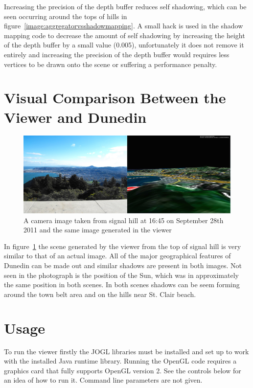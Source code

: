 \documentclass[12pt]{report}
\begin{document}
Increasing the precision of the depth buffer reduces self shadowing, which can be seen occurring around the tops of hills in figure~\ref{image:aggregatorvsshadowmapping}. A small hack is used in the shadow mapping code to decrease the amount of self shadowing by increasing the height of the depth buffer by a small value (0.005), unfortunately it does not remove it entirely and increasing the precision of the depth buffer would requires less vertices to be drawn onto the scene or suffering a performance penalty.

\section{Visual Comparison Between the Viewer and Dunedin}
\begin{figure}[h]
\centering
\includegraphics[width=\textwidth]{realvsviewer.jpg}
\caption{A camera image taken from signal hill at 16:45 on September 28th 2011 and the same image generated in the viewer}
\label{image:realvsviewer}
\end{figure}

In figure~\ref{image:realvsviewer} the scene generated by the viewer from the top of signal hill is very similar to that of an actual image. All of the major geographical features of Dunedin can be made out and similar shadows are present in both images. Not seen in the photograph is the position of the Sun, which was in approximately the same position in both scenes. In both scenes shadows can be seem forming around the town belt area and on the hills near St. Clair beach.

\section{Usage}

To run the viewer firstly the JOGL libraries must be installed and set up to work with the installed Java runtime library. Running the OpenGL code requires a graphics card that fully supports OpenGL version 2. See the controls below for an idea of how to run it. Command line parameters are not given.
\end{document}
